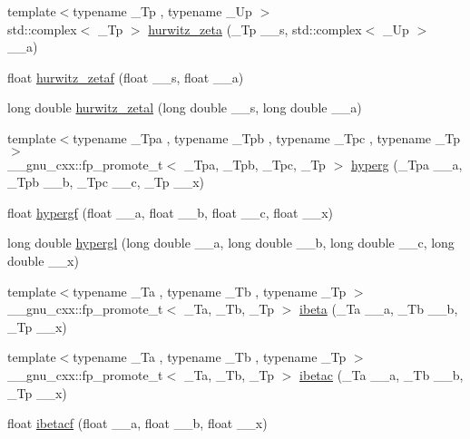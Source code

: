 \begin{DoxyCompactItemize}
\item 
{\footnotesize template$<$typename \+\_\+\+Tp , typename \+\_\+\+Up $>$ }\\std\+::complex$<$ \+\_\+\+Tp $>$ \hyperlink{group__mathsf__gnu_gaa7f0d1fbba9d2ce07a30d907302d527f}{hurwitz\+\_\+zeta} (\+\_\+\+Tp \+\_\+\+\_\+s, std\+::complex$<$ \+\_\+\+Up $>$ \+\_\+\+\_\+a)
\item 
float \hyperlink{group__mathsf__gnu_gaa745d7f2edde060ed2f22817ad89df1f}{hurwitz\+\_\+zetaf} (float \+\_\+\+\_\+s, float \+\_\+\+\_\+a)
\item 
long double \hyperlink{group__mathsf__gnu_gad8f2cfc7e198755968bae35d46b49d5a}{hurwitz\+\_\+zetal} (long double \+\_\+\+\_\+s, long double \+\_\+\+\_\+a)
\item 
{\footnotesize template$<$typename \+\_\+\+Tpa , typename \+\_\+\+Tpb , typename \+\_\+\+Tpc , typename \+\_\+\+Tp $>$ }\\\+\_\+\+\_\+gnu\+\_\+cxx\+::fp\+\_\+promote\+\_\+t$<$ \+\_\+\+Tpa, \+\_\+\+Tpb, \+\_\+\+Tpc, \+\_\+\+Tp $>$ \hyperlink{group__mathsf__gnu_ga374198e4076f9e23f3878ca3af70e6da}{hyperg} (\+\_\+\+Tpa \+\_\+\+\_\+a, \+\_\+\+Tpb \+\_\+\+\_\+b, \+\_\+\+Tpc \+\_\+\+\_\+c, \+\_\+\+Tp \+\_\+\+\_\+x)
\item 
float \hyperlink{group__mathsf__gnu_gac4c81e4ea9cef149fe40291ca10d7e15}{hypergf} (float \+\_\+\+\_\+a, float \+\_\+\+\_\+b, float \+\_\+\+\_\+c, float \+\_\+\+\_\+x)
\item 
long double \hyperlink{group__mathsf__gnu_ga9961967087216e97f76283f29e1be152}{hypergl} (long double \+\_\+\+\_\+a, long double \+\_\+\+\_\+b, long double \+\_\+\+\_\+c, long double \+\_\+\+\_\+x)
\item 
{\footnotesize template$<$typename \+\_\+\+Ta , typename \+\_\+\+Tb , typename \+\_\+\+Tp $>$ }\\\+\_\+\+\_\+gnu\+\_\+cxx\+::fp\+\_\+promote\+\_\+t$<$ \+\_\+\+Ta, \+\_\+\+Tb, \+\_\+\+Tp $>$ \hyperlink{group__mathsf__gnu_ga1fa9e260ba85fc043e3d2ada99c0143c}{ibeta} (\+\_\+\+Ta \+\_\+\+\_\+a, \+\_\+\+Tb \+\_\+\+\_\+b, \+\_\+\+Tp \+\_\+\+\_\+x)
\item 
{\footnotesize template$<$typename \+\_\+\+Ta , typename \+\_\+\+Tb , typename \+\_\+\+Tp $>$ }\\\+\_\+\+\_\+gnu\+\_\+cxx\+::fp\+\_\+promote\+\_\+t$<$ \+\_\+\+Ta, \+\_\+\+Tb, \+\_\+\+Tp $>$ \hyperlink{group__mathsf__gnu_ga2ccfb7026771d75bcc1a588edb8b0165}{ibetac} (\+\_\+\+Ta \+\_\+\+\_\+a, \+\_\+\+Tb \+\_\+\+\_\+b, \+\_\+\+Tp \+\_\+\+\_\+x)
\item 
float \hyperlink{group__mathsf__gnu_gabd7fa090deead18b167c26b8994b9f53}{ibetacf} (float \+\_\+\+\_\+a, float \+\_\+\+\_\+b, float \+\_\+\+\_\+x)

\end{DoxyCompactItemize}
